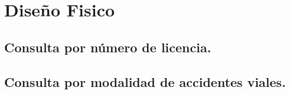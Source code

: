 \section{Diseño Fisico}


\subsection{Consulta por número de licencia.}



\subsection{Consulta por modalidad de accidentes viales.}

